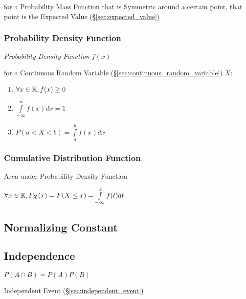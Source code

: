 for a Probability Mass Function that is Symmetric around a certain point, that
point is the Expected Value (\S\ref{sec:expected_value})



\subsubsection{Probability Density Function}
\label{sec:probability_density}

\emph{Probability Density Function} $f(x)$

for a Continuous Random Variable
(\S\ref{sec:continuous_random_variable}) $X$:
\begin{enumerate}
  \item $\forall x \in \mathbb{R}, f(x) \geq 0$
  \item $\int\limits_{-\infty}^{\infty} f(x) dx = 1$
  \item $P (a < X < b) = \int\limits_a^b f(x) dx$
\end{enumerate}



\subsubsection{Cumulative Distribution Function}
\label{sec:cumulative_distribution}

Area under Probability Density Function

$\forall x \in \mathbb{R}, F_X(x) = P(X \leq x) = \int\limits_{-\infty}^x
f(t) dt$



\subsection{Normalizing Constant}\label{sec:normalizing_constant}

\subsection{Independence}\label{sec:independence}

$P(A \cap B) = P(A)P(B)$

\fist Independent Event (\S\ref{sec:independent_event})



